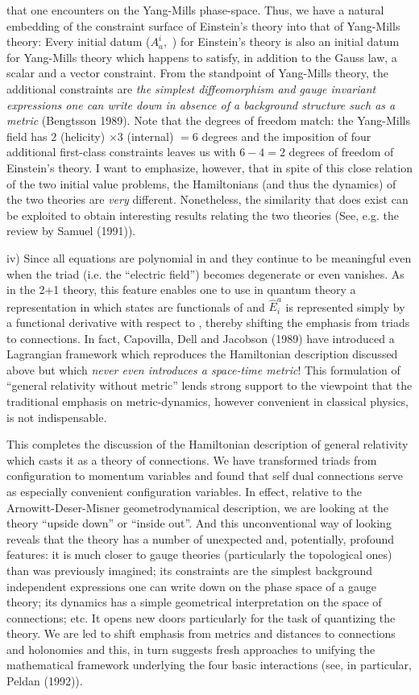 that one encounters on the Yang-Mills phase-space. Thus, we have a natural
embedding of the constraint surface of Einstein's theory into that of
Yang-Mills theory: Every initial datum ($A_a^i,$ \E ) for Einstein's theory
is also an initial datum for Yang-Mills theory which happens to satisfy,
in addition to the Gauss law, a scalar and a vector constraint. From the
standpoint of Yang-Mills theory, the additional constraints are {\it the
simplest diffeomorphism and gauge invariant expressions one can write down
in absence of a background structure such as a metric} (Bengtsson 1989).
Note that the
degrees of freedom match: the Yang-Mills field has $2$ (helicity) $\times 3$
(internal) $= 6$ degrees and the imposition of four additional first-class
constraints leaves us with $6-4 =2$ degrees of freedom of Einstein's theory.
I want to emphasize, however, that in spite of this close relation of the
two initial value problems, the Hamiltonians (and thus the dynamics) of the
two theories are {\it very} different. Nonetheless, the similarity that
does exist can be exploited to obtain interesting results relating the two
theories (See, e.g. the review by Samuel (1991)).
\item{iv)} Since all equations are polynomial in \A\- and \E\- they continue
to be meaningful even when the triad (i.e. the ``electric field'') \E\-
becomes degenerate or even vanishes. As in the 2+1 theory, this feature
enables one to use in quantum theory a representation in which states are
functionals of \A and $\hat{E}^a_i$ is represented simply by a functional
derivative with respect to \A , thereby shifting the emphasis from triads
to connections. In fact, Capovilla, Dell and Jacobson (1989) have introduced
a Lagrangian framework which reproduces the Hamiltonian description discussed
above but which {\it never even introduces a space-time metric}! This
formulation of ``general relativity without metric'' lends strong support
to the viewpoint that the traditional emphasis on metric-dynamics, however
convenient in classical physics, is not indispensable.

This completes the discussion of the Hamiltonian description of general
relativity which casts it as a theory of connections. We have transformed
triads from configuration to momentum variables and found that self dual
connections serve as especially convenient configuration variables. In
effect, relative to the Arnowitt-Deser-Misner geometrodynamical
description, we are looking at the theory ``upside down'' or ``inside
out''. And this unconventional way of looking reveals that the theory has
a number of unexpected and, potentially, profound features: it is much closer
to gauge theories (particularly the topological ones) than was previously
imagined; its constraints are the simplest background independent expressions
one can write down on the phase space of a gauge theory; its dynamics has a
simple geometrical interpretation on the space of connections; etc. It opens
new doors particularly for the task of quantizing the theory. We are led to
shift emphasis from metrics and distances to connections and holonomies and
this, in turn suggests fresh approaches to unifying the mathematical framework
underlying the four basic interactions (see, in particular, Peldan (1992)).

